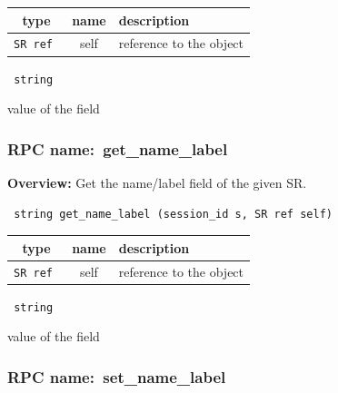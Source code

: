 
 
\vspace{0.3cm}
\begin{tabular}{|c|c|p{7cm}|}
 \hline
{\bf type} & {\bf name} & {\bf description} \\ \hline
{\tt SR ref } & self & reference to the object \\ \hline 

\end{tabular}

\vspace{0.3cm}

{\tt 
string
}


value of the field
\vspace{0.3cm}
\vspace{0.3cm}
\vspace{0.3cm}
\subsubsection{RPC name:~get\_name\_label}

{\bf Overview:} 
Get the name/label field of the given SR.

\begin{verbatim} string get_name_label (session_id s, SR ref self)\end{verbatim}



 
\vspace{0.3cm}
\begin{tabular}{|c|c|p{7cm}|}
 \hline
{\bf type} & {\bf name} & {\bf description} \\ \hline
{\tt SR ref } & self & reference to the object \\ \hline 

\end{tabular}

\vspace{0.3cm}

{\tt 
string
}


value of the field
\vspace{0.3cm}
\vspace{0.3cm}
\vspace{0.3cm}
\subsubsection{RPC name:~set\_name\_label}

